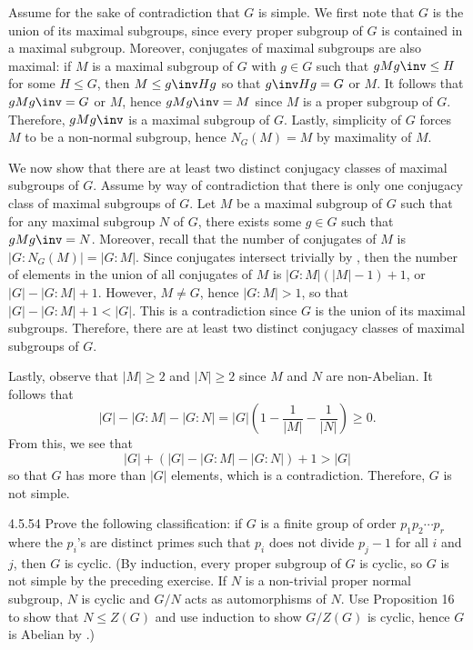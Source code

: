 \begin{sol}
	Assume for the sake of contradiction that $G$ is simple.
	We first note that $G$ is the union of its maximal subgroups, since every proper subgroup of $G$ is contained in a maximal subgroup.
	Moreover, conjugates of maximal subgroups are also maximal: if $M$ is a maximal subgroup of $G$ with $g \in G$ such that $gMg \inv \leq H$ for some $H \leq G$, then $M \leq g\inv Hg$ so that $g\inv Hg = G$ or $M$.
	It follows that $gMg\inv = G$ or $M$, hence $gMg\inv = M$ since $M$ is a proper subgroup of $G$.
	Therefore, $gMg\inv$ is a maximal subgroup of $G$.
	Lastly, simplicity of $G$ forces $M$ to be a non-normal subgroup, hence $N_G(M) = M$ by maximality of $M$.

	We now show that there are at least two distinct conjugacy classes of maximal subgroups of $G$.
	Assume by way of contradiction that there is only one conjugacy class of maximal subgroups of $G$.
	Let $M$ be a maximal subgroup of $G$ such that for any maximal subgroup $N$ of $G$, there exists some $g \in G$ such that $gMg\inv = N$.
	Moreover, recall that the number of conjugates of $M$ is $|G : N_G(M)| = |G : M|$.
	Since conjugates intersect trivially by , then the number of elements in the union of all conjugates of $M$ is $|G : M|(|M| - 1) + 1$, or $|G| - |G : M| + 1$.
	However, $M \neq G$, hence $|G : M| > 1$, so that $|G| - |G : M| + 1 < |G|$.
	This is a contradiction since $G$ is the union of its maximal subgroups.
	Therefore, there are at least two distinct conjugacy classes of maximal subgroups of $G$.

	Lastly, observe that $|M| \geq 2$ and $|N| \geq 2$ since $M$ and $N$ are non-Abelian.
	It follows that
	\[
		|G| - |G : M| - |G : N| = |G|\left(1 - \frac{1}{|M|} - \frac{1}{|N|}\right) \geq 0.
	\]
	From this, we see that
	\[
		|G| + (|G| - |G : M| - |G : N|) + 1 > |G|
	\]
	so that $G$ has more than $|G|$ elements, which is a contradiction.
	Therefore, $G$ is not simple.
\end{sol}

\begin{exercise}{4.5.54}
	Prove the following classification: if $G$ is a finite group of order $p_1p_2 \cdots p_r$ where the $p_i$'s are distinct primes such that $p_i$ does not divide $p_j - 1$ for all $i$ and $j$, then $G$ is cyclic. (By induction, every proper subgroup of $G$ is cyclic, so $G$ is not simple by the preceding exercise.
	If $N$ is a non-trivial proper normal subgroup, $N$ is cyclic and $G/N$ acts as automorphisms of $N$.
	Use Proposition 16 to show that $N \leq Z(G)$ and use induction to show $G/Z(G)$ is cyclic, hence $G$ is Abelian by .)
\end{exercise}

